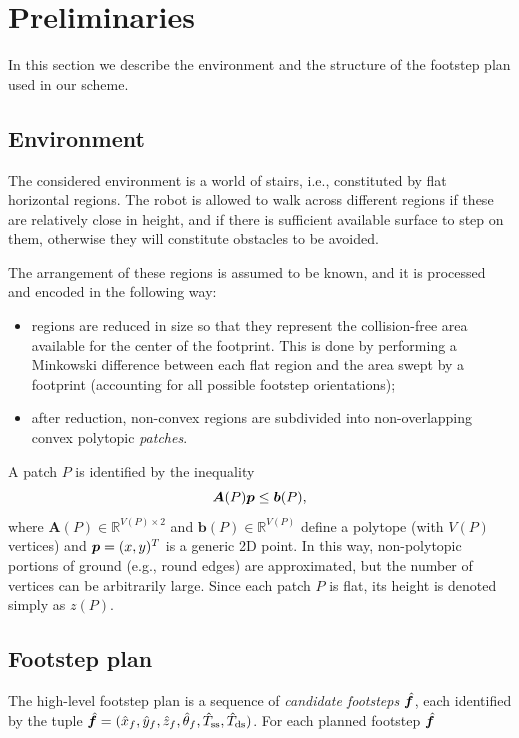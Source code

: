 \section{Preliminaries}
\label{sec:FAPA:Preliminaries}
In this section we describe the environment and the structure of the footstep
plan used in our scheme.

\subsection{Environment}
The considered environment is a world of stairs, i.e., constituted by flat
horizontal regions. The robot is allowed to walk across different regions if
these are relatively close in height, and if there is sufficient available
surface to step on them, otherwise they will constitute obstacles to be avoided.

The arrangement of these regions is assumed to be known, and it is processed
and encoded in the following way:
\begin{itemize}
    \item regions are reduced in size so that they represent the collision-free
        area available for the center of the footprint. This is done by
        performing a Minkowski difference between each flat region and the
        area swept by a footprint (accounting for all possible footstep orientations);
    \item after reduction, non-convex regions are subdivided into
        non-overlapping convex polytopic {\em patches}.
\end{itemize}
A patch $P$ is identified by the inequality
\begin{equation*}
{\bm{A}}(P) {\bm{p}} \le {\bm{b}}(P),
\end{equation*}
where $\bm{A}(P) \in \mathbb{R}^{V(P) \times 2}$ and
$\bm{b}(P) \in \mathbb{R}^{V(P)} $ define a polytope (with $V(P)$ vertices)
and ${\bm{p}} = (x, y)^T$ is a generic 2D point. 
In this way, non-polytopic portions of ground (e.g., round edges) are
approximated, but the number of vertices can be arbitrarily large.
Since each patch $P$ is flat, its height is denoted simply as $z(P)$.

\subsection{Footstep plan}
The high-level footstep plan is a sequence of {\em candidate footsteps}
$\hat{{\bm{f}}}$, each identified by the tuple
$\hat{{\bm{f}}} = (\hat x_f, \hat y_f, \hat z_f, \hat\theta_f, \hat T_{\rm ss}, \hat T_{\rm ds})$.
For each planned footstep $\hat{{\bm{f}}}$

